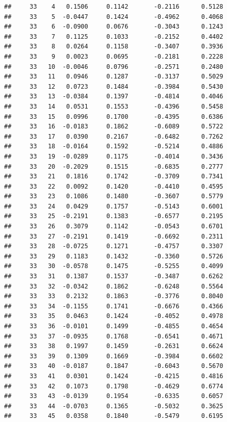 \documentclass[
]{article}
\begin{document}
\begin{verbatim}
##     33    4   0.1506     0.1142       -0.2116      0.5128  
##     33    5  -0.0447     0.1424       -0.4962      0.4068  
##     33    6  -0.0900     0.0676       -0.3043      0.1243  
##     33    7   0.1125     0.1033       -0.2152      0.4402  
##     33    8   0.0264     0.1158       -0.3407      0.3936  
##     33    9   0.0023     0.0695       -0.2181      0.2228  
##     33   10  -0.0046     0.0796       -0.2571      0.2480  
##     33   11   0.0946     0.1287       -0.3137      0.5029  
##     33   12   0.0723     0.1484       -0.3984      0.5430  
##     33   13  -0.0384     0.1397       -0.4814      0.4046  
##     33   14   0.0531     0.1553       -0.4396      0.5458  
##     33   15   0.0996     0.1700       -0.4395      0.6386  
##     33   16  -0.0183     0.1862       -0.6089      0.5722  
##     33   17   0.0390     0.2167       -0.6482      0.7262  
##     33   18  -0.0164     0.1592       -0.5214      0.4886  
##     33   19  -0.0289     0.1175       -0.4014      0.3436  
##     33   20  -0.2029     0.1515       -0.6835      0.2777  
##     33   21   0.1816     0.1742       -0.3709      0.7341  
##     33   22   0.0092     0.1420       -0.4410      0.4595  
##     33   23   0.1086     0.1480       -0.3607      0.5779  
##     33   24   0.0429     0.1757       -0.5143      0.6001  
##     33   25  -0.2191     0.1383       -0.6577      0.2195  
##     33   26   0.3079     0.1142       -0.0543      0.6701  
##     33   27  -0.2191     0.1419       -0.6692      0.2311  
##     33   28  -0.0725     0.1271       -0.4757      0.3307  
##     33   29   0.1183     0.1432       -0.3360      0.5726  
##     33   30  -0.0578     0.1475       -0.5255      0.4099  
##     33   31   0.1387     0.1537       -0.3487      0.6262  
##     33   32  -0.0342     0.1862       -0.6248      0.5564  
##     33   33   0.2132     0.1863       -0.3776      0.8040  
##     33   34  -0.1155     0.1741       -0.6676      0.4366  
##     33   35   0.0463     0.1424       -0.4052      0.4978  
##     33   36  -0.0101     0.1499       -0.4855      0.4654  
##     33   37  -0.0935     0.1768       -0.6541      0.4671  
##     33   38   0.1997     0.1459       -0.2631      0.6624  
##     33   39   0.1309     0.1669       -0.3984      0.6602  
##     33   40  -0.0187     0.1847       -0.6043      0.5670  
##     33   41   0.0301     0.1424       -0.4215      0.4816  
##     33   42   0.1073     0.1798       -0.4629      0.6774  
##     33   43  -0.0139     0.1954       -0.6335      0.6057  
##     33   44  -0.0703     0.1365       -0.5032      0.3625  
##     33   45   0.0358     0.1840       -0.5479      0.6195  

\end{verbatim}
\end{document}
